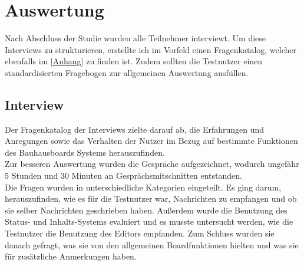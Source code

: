 \section{Auswertung}\label{Auswertung}
Nach Abschluss der Studie wurden alle Teilnehmer interviewt.
Um diese Interviews zu strukturieren, erstellte ich im Vorfeld einen Fragenkatalog, welcher ebenfalls im [\hyperref[fragenkatalog]{Anhang}] zu finden ist.
Zudem sollten die Testnutzer einen standardisierten Fragebogen zur allgemeinen Auswertung ausfüllen.
\subsection{Interview}\label{Interviews}
Der Fragenkatalog der Interviews zielte darauf ab, die Erfahrungen und Anregungen sowie das Verhalten der Nutzer im Bezug auf bestimmte Funktionen des Bauhausboards Systems herauszufinden.
\\
Zur besseren Auswertung wurden die Gespräche aufgezeichnet, wodurch ungefähr 5 Stunden und 30 Minuten an Gesprächsmitschnitten entstanden. 
\\
Die Fragen wurden in unterschiedliche Kategorien eingeteilt.
Es ging darum, herauszufinden, wie es für die Testnutzer war, Nachrichten zu empfangen und ob sie selber Nachrichten geschrieben haben.
Außerdem wurde die Benutzung des Status- und Inhalts-Systems evaluiert und es musste untersucht werden, wie die Testnutzer die Benutzung des Editors empfanden.
Zum Schluss wurden sie danach gefragt, was sie von den allgemeinen Boardfunktionen hielten und was sie für zusätzliche Anmerkungen haben.

